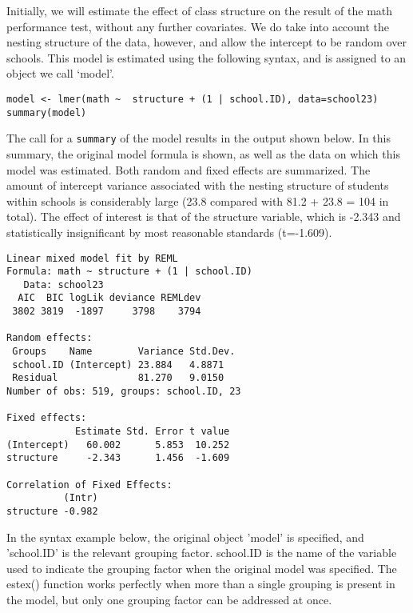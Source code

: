 \documentclass{article}
\begin{document}
Initially, we will estimate the effect of class structure on the result of the math performance test, without any further covariates. We do take into account the nesting structure of the data, however, and allow the intercept to be random over schools. This model is estimated using the following syntax, and is assigned to an object we call ‘model’.
\begin{framed}
\begin{verbatim}
model <- lmer(math ~  structure + (1 | school.ID), data=school23)
summary(model)
\end{verbatim}
\end{framed}
The call for a \texttt{summary} of the model results in the output shown below. In this summary, the original model formula is shown, as well as the data on which this model was estimated. Both random and fixed effects are summarized. The amount of intercept variance associated with the nesting structure of students within schools is considerably large (23.8 compared with 81.2 + 23.8 = 104 in total). The effect of interest is that of the structure variable, which is -2.343 and statistically insignificant by most reasonable standards (t=-1.609).

\begin{framed}
\begin{verbatim}
Linear mixed model fit by REML 
Formula: math ~ structure + (1 | school.ID) 
   Data: school23 
  AIC  BIC logLik deviance REMLdev
 3802 3819  -1897     3798    3794
 
Random effects:
 Groups    Name        Variance Std.Dev.
 school.ID (Intercept) 23.884   4.8871  
 Residual              81.270   9.0150  
Number of obs: 519, groups: school.ID, 23

Fixed effects:
            Estimate Std. Error t value
(Intercept)   60.002      5.853  10.252
structure     -2.343      1.456  -1.609

Correlation of Fixed Effects:
          (Intr)
structure -0.982
\end{verbatim}
\end{framed}

In the syntax example below, the original object 'model' is specified, and 'school.ID' is the relevant grouping factor. school.ID is the name of the variable used to indicate the grouping factor when the original model was specified. The estex() function works perfectly when more than a single grouping is present in the model, but only one grouping factor can be addressed at once.
\end{document}
